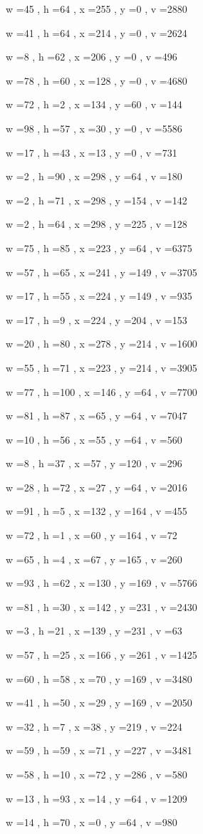 \documentclass[11pt]{article}
\begin{document}
w =45 , h =64 , x =255 , y =0 , v =2880
\par
w =41 , h =64 , x =214 , y =0 , v =2624
\par
w =8 , h =62 , x =206 , y =0 , v =496
\par
w =78 , h =60 , x =128 , y =0 , v =4680
\par
w =72 , h =2 , x =134 , y =60 , v =144
\par
w =98 , h =57 , x =30 , y =0 , v =5586
\par
w =17 , h =43 , x =13 , y =0 , v =731
\par
w =2 , h =90 , x =298 , y =64 , v =180
\par
w =2 , h =71 , x =298 , y =154 , v =142
\par
w =2 , h =64 , x =298 , y =225 , v =128
\par
w =75 , h =85 , x =223 , y =64 , v =6375
\par
w =57 , h =65 , x =241 , y =149 , v =3705
\par
w =17 , h =55 , x =224 , y =149 , v =935
\par
w =17 , h =9 , x =224 , y =204 , v =153
\par
w =20 , h =80 , x =278 , y =214 , v =1600
\par
w =55 , h =71 , x =223 , y =214 , v =3905
\par
w =77 , h =100 , x =146 , y =64 , v =7700
\par
w =81 , h =87 , x =65 , y =64 , v =7047
\par
w =10 , h =56 , x =55 , y =64 , v =560
\par
w =8 , h =37 , x =57 , y =120 , v =296
\par
w =28 , h =72 , x =27 , y =64 , v =2016
\par
w =91 , h =5 , x =132 , y =164 , v =455
\par
w =72 , h =1 , x =60 , y =164 , v =72
\par
w =65 , h =4 , x =67 , y =165 , v =260
\par
w =93 , h =62 , x =130 , y =169 , v =5766
\par
w =81 , h =30 , x =142 , y =231 , v =2430
\par
w =3 , h =21 , x =139 , y =231 , v =63
\par
w =57 , h =25 , x =166 , y =261 , v =1425
\par
w =60 , h =58 , x =70 , y =169 , v =3480
\par
w =41 , h =50 , x =29 , y =169 , v =2050
\par
w =32 , h =7 , x =38 , y =219 , v =224
\par
w =59 , h =59 , x =71 , y =227 , v =3481
\par
w =58 , h =10 , x =72 , y =286 , v =580
\par
w =13 , h =93 , x =14 , y =64 , v =1209
\par
w =14 , h =70 , x =0 , y =64 , v =980
\par
\newpage
\end{document}
